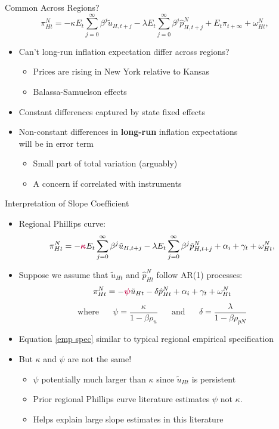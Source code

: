 \documentclass[11pt,aspectratio=169,xcolor={dvipsnames},hyperref={pdftex,pdfpagemode=UseNone,hidelinks,pdfdisplaydoctitle=true},usepdftitle=false]{beamer}
\begin{document}
\begin{frame}{Common Across Regions?}
	\[\pi_{Ht}^N = - \kappa E_{t} \sum_{j=0}^{\infty} \beta^j  \tilde{u}_{H,t+j} - \lambda E_{t} \sum_{j=0}^{\infty} \beta^j \hat{p}_{H,t+j}^N + E_{t}\pi_{t+\infty} + \omega_{Ht}^N, \]
	\vspace{-10pt}
	\begin{itemize}
		\itemsep1em 
		\item Can't long-run inflation expectation differ across regions?
		\begin{itemize}
			\item Prices are rising in New York relative to Kansas
			\item Balassa-Samuelson effects 
		\end{itemize}
		\item Constant differences captured by state fixed effects
		\item Non-constant differences in \textbf{long-run} inflation expectations \\ will be in error term
		\begin{itemize}
			\item Small part of total variation (arguably)
			\item A concern if correlated with instruments
		\end{itemize}
	\end{itemize}
\end{frame}


\begin{frame}{Interpretation of Slope Coefficient}
	\begin{itemize}
		\itemsep1em 
		\item Regional Phillips curve:
		\[\pi_{Ht}^N = - \textcolor{purple}{\boldsymbol{\kappa}} E_{t} \sum_{j=0}^{\infty} \beta^j  \tilde{u}_{H,t+j} - \lambda E_{t} \sum_{j=0}^{\infty} \beta^j \hat{p}_{H,t+j}^N + \alpha_i + \gamma_t + \omega_{Ht}^N, \]
		\item Suppose we assume that $\tilde{u}_{Ht}$ and $\hat{p}_{Ht}^N$ follow AR(1) processes:
		\begin{equation} \label{emp spec} 
			\pi_{Ht}^N = - \textcolor{purple}{\boldsymbol{\psi}} \tilde{u}_{Ht} - \delta \hat{p}_{Ht}^N + \alpha_i + \gamma_t + \omega_{Ht}^N
		\end{equation} 
		\[ \text{where} \;\;\;\;\;\; \psi = \frac{\kappa}{1-\beta\rho_{u}} \;\;\;\;\;\; \text{and} \;\;\;\;\;\; \delta = \frac{\lambda}{1-\beta\rho_{pN}} \]
		\item Equation \eqref{emp spec} similar to typical regional empirical specification
		\item But $\kappa$ and $\psi$ are not the same! 
		\begin{itemize}
			\item $\psi$ potentially much larger than $\kappa$ since $\tilde{u}_{Ht}$ is persistent
			\item Prior regional Phillips curve literature estimates $\psi$ not $\kappa$.
			\item Helps explain large slope estimates in this literature  
		\end{itemize}
	\end{itemize}
\end{frame}
\end{document}
